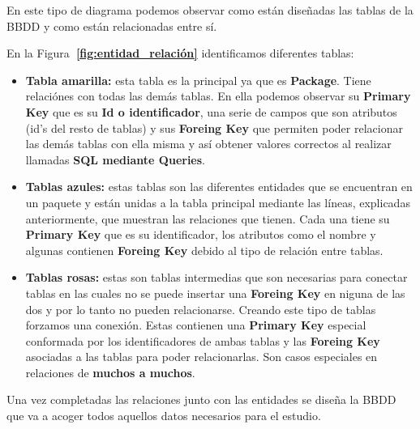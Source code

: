 \documentclass[a4paper, 12pt]{book}
\begin{document}
En este tipo de diagrama podemos observar como están diseñadas las tablas de la BBDD y como están relacionadas entre sí.

En la Figura\textbf {~\ref{fig:entidad_relación}} identificamos diferentes tablas:

\begin{itemize}
	\item \textbf {Tabla amarilla: }esta tabla es la principal ya que es \textbf {Package}. Tiene relaciónes con todas las demás tablas. En ella podemos observar su \textbf {Primary Key} que es su \textbf {Id o identificador}, una serie de campos que son atributos (id's del resto de tablas) y sus \textbf {Foreing Key} que permiten poder relacionar las demás tablas con ella misma y así obtener valores correctos al realizar llamadas \textbf {SQL mediante Queries}.
	
	\item \textbf {Tablas azules: }estas tablas son las diferentes entidades que se encuentran en un paquete y están unidas a la tabla principal mediante las líneas, explicadas anteriormente, que muestran las relaciones que tienen.
	Cada una tiene su \textbf {Primary Key} que es su identificador, los atributos como el nombre y algunas contienen \textbf {Foreing Key} debido al tipo de relación entre tablas.
	
	\item \textbf {Tablas rosas: }estas son tablas intermedias que son necesarias para conectar tablas en las cuales no se puede insertar una \textbf {Foreing Key} en niguna de las dos y por lo tanto no pueden relacionarse. Creando este tipo de tablas forzamos una conexión. Estas contienen una \textbf {Primary Key} especial conformada por los identificadores de ambas tablas y las \textbf {Foreing Key} asociadas a las tablas para poder relacionarlas.
	Son casos especiales en relaciones de \textbf {muchos a muchos}.
\end{itemize}

Una vez completadas las relaciones junto con las entidades se diseña la BBDD que va a acoger todos aquellos datos necesarios para el estudio.
\end{document}
